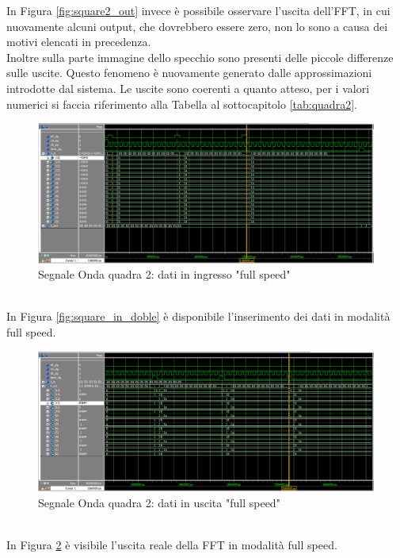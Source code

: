 \documentclass[a4paper, titlepage]{article}
\begin{document}
In Figura \ref{fig:square2_out} invece è possibile osservare l'uscita dell'FFT, in cui nuovamente alcuni output, che dovrebbero essere zero, non lo sono a causa dei motivi elencati in precedenza.\\ Inoltre sulla parte immagine dello specchio sono presenti delle piccole differenze sulle uscite. Questo fenomeno è nuovamente generato dalle approssimazioni introdotte dal sistema. Le uscite sono coerenti a quanto atteso, per i valori numerici si faccia riferimento alla Tabella al sottocapitolo \ref{tab:quadra2}.
\pagebreak
\begin{figure}[h]
    \centering
    \includegraphics[scale=0.45]{test_square2/fs_q(+5 -5)_in_doble.png}
    \caption{Segnale Onda quadra 2: dati in ingresso "full speed"}
    \label{fig:square2_in_doble}
\end{figure}
\\In Figura \ref{fig:square_in_doble} è disponibile l'inserimento dei dati in modalità full speed.
\begin{figure}[h]
    \centering
    \includegraphics[scale=0.45]{test_square2/fs_q(+5-5)_out_doble1.png}
    \caption{Segnale Onda quadra 2: dati in uscita "full speed"}
    \label{fig:square2_out_doble1}
\end{figure}
\\In Figura \ref{fig:square2_out_doble1} è visibile l'uscita reale della FFT in modalità full speed.
\pagebreak
\end{document}
